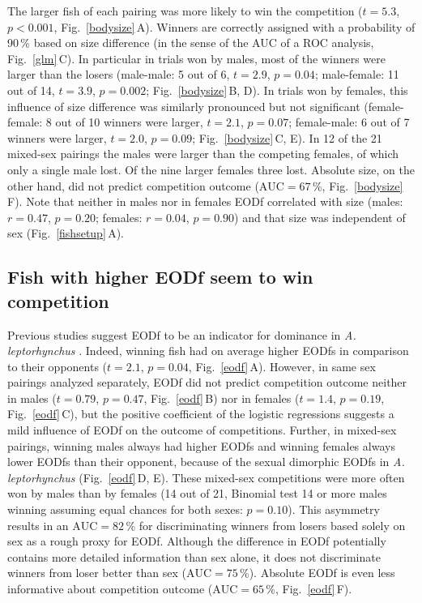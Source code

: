 \documentclass[vruler,JEB]{COB}%
\newcommand{\lepto}{\textit{A. leptorhynchus}}
\newcommand{\panel}[1]{\textsf{#1}}
\newcommand{\subfref}[2]{\textup{\ref{#1}}\,\panel{#2}}
\newcommand{\Figb}{Fig.}
\newcommand{\Subfigrefb}[2]{\Figb~\subfref{#1}{#2}}
\begin{document}
The larger fish of each pairing was more likely to win the competition ($t=5.3$, $p<0.001$, \Subfigrefb{bodysize}{A}). Winners are correctly assigned with a probability of 90\,\% based on size difference (in the sense of the AUC of a ROC analysis, \Subfigrefb{glm}{C}). In particular in trials won by males, most of the winners were larger than the losers (male-male: 5 out of 6, $t=2.9$, $p=0.04$; male-female: 11 out of 14, $t=3.9$, $p=0.002$; \Subfigrefb{bodysize}{B, D}). In trials won by females, this influence of size difference was similarly pronounced but not significant (female-female: 8 out of 10 winners were larger, $t=2.1$, $p=0.07$; female-male: 6 out of 7 winners were larger, $t=2.0$, $p=0.09$; \Subfigrefb{bodysize}{C, E}). In 12 of the 21 mixed-sex pairings the males were larger than the competing females, of which only a single male lost. Of the nine larger females three lost. Absolute size, on the other hand, did not predict competition outcome ($\text{AUC}=67$\,\%, \Subfigrefb{bodysize}{F}). Note that neither in males nor in females EODf correlated with size (males: $r=0.47$, $p=0.20$; females: $r=0.04$, $p=0.90$) and that size was independent of sex (\Subfigrefb{fishsetup}{A}).

\subsection{Fish with higher EODf seem to win competition}

Previous studies suggest EODf to be an indicator for dominance in \lepto{} \citep{Dunlap2002, Henninger2018, Raab2019}. Indeed, winning fish had on average higher EODfs in comparison to their opponents ($t=2.1$, $p=0.04$, \Subfigrefb{eodf}{A}). However, in same sex pairings analyzed separately, EODf did not predict competition outcome neither in males ($t=0.79$, $p=0.47$, \Subfigrefb{eodf}{B}) nor in females ($t=1.4$, $p=0.19$, \Subfigrefb{eodf}{C}), but the positive coefficient of the logistic regressions suggests a mild influence of EODf on the outcome of competitions. Further, in mixed-sex pairings, winning males always had higher EODfs and winning females always lower EODfs than their opponent, because of the sexual dimorphic EODfs in \lepto{} (\Subfigrefb{eodf}{D, E}). These mixed-sex competitions were more often won by males than by females (14 out of 21, Binomial test 14 or more males winning assuming equal chances for both sexes: $p=0.10$). This asymmetry results in an $\text{AUC}=82$\,\% for discriminating winners from losers based solely on sex as a rough proxy for EODf. Although the difference in EODf potentially contains more detailed information than sex alone, it does not discriminate winners from loser better than sex ($\text{AUC}=75$\,\%). Absolute EODf is even less informative about competition outcome ($\text{AUC}=65$\,\%, \Subfigrefb{eodf}{F}).
\end{document}
